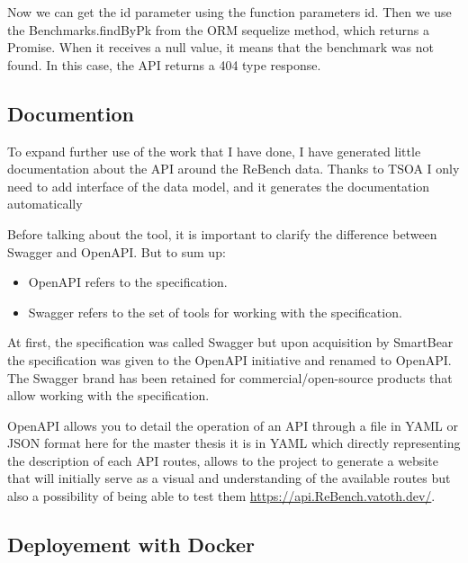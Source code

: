 \documentclass[12pt,a4paper]{article}
\begin{document}
Now we can get the id parameter using the function parameters id. Then we use the Benchmarks.findByPk from the ORM sequelize method, which returns a Promise. When it receives a null value, it means that the benchmark was not found. In this case, the API returns a 404 type response.

\subsection{Documention}

To expand further use of the work that I have done, I have generated little documentation about the API around the ReBench data.
Thanks to TSOA I only need to add interface of the data model, and it generates the documentation automatically

Before talking about the tool, it is important to clarify the difference between Swagger and OpenAPI. But to sum up:

\begin{itemize}
    \item OpenAPI refers to the specification.
    \item Swagger refers to the set of tools for working with the specification.
\end{itemize}

At first, the specification was called Swagger but upon acquisition by SmartBear the specification was given to the OpenAPI initiative and renamed to OpenAPI. The Swagger brand has been retained for commercial/open-source products that allow working with the specification.

OpenAPI allows you to detail the operation of an API through a file in YAML or JSON format here for the master thesis it is in YAML which directly representing the description of each API routes, allows to the project to generate a website that will initially serve as a visual and understanding of the available routes but also a possibility of being able to test them \url{https://api.ReBench.vatoth.dev/}.



\subsection{Deployement with Docker}
\end{document}
